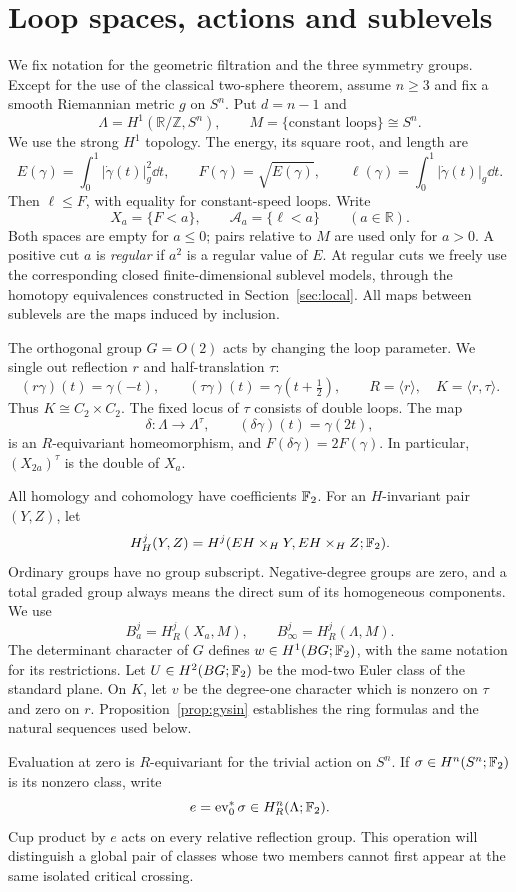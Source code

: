\section{Loop spaces, actions and sublevels}\label{sec:setup}

We fix notation for the geometric filtration and the three symmetry groups.
Except for the use of the classical two-sphere theorem, assume $n\ge3$ and
fix a smooth Riemannian metric $g$ on $S^n$. Put $d=n-1$ and
\[
 \Lambda=H^1(\mathbb R/\mathbb Z,S^n),\qquad
 M=\{\text{constant loops}\}\cong S^n.
\]
We use the strong $H^1$ topology. The energy, its square root, and length are
\[
 E(\gamma)=\int_0^1|\dot\gamma(t)|_g^2\dd t,
 \qquad F(\gamma)=\sqrt{E(\gamma)},
 \qquad \ell(\gamma)=\int_0^1|\dot\gamma(t)|_g\dd t.
\]
Then $\ell\le F$, with equality for constant-speed loops. Write
\[
 X_a=\{F<a\},\qquad \mathcal A_a=\{\ell<a\}\qquad(a\in\mathbb R).
\]
Both spaces are empty for $a\le0$; pairs relative to $M$ are used only
for $a>0$.
A positive cut $a$ is \emph{regular} if $a^2$ is a regular value of $E$.
At regular cuts we freely use the corresponding closed finite-dimensional
sublevel models, through the homotopy equivalences constructed in
Section~\ref{sec:local}. All maps between sublevels are the maps induced by
inclusion.

The orthogonal group $G=O(2)$ acts by changing the loop parameter. We single
out reflection $r$ and half-translation $\tau$:
\[
 (r\gamma)(t)=\gamma(-t),\qquad
 (\tau\gamma)(t)=\gamma(t+\tfrac12),\qquad
 R=\langle r\rangle,\quad K=\langle r,\tau\rangle.
\]
Thus $K\cong C_2\times C_2$. The fixed locus of $\tau$ consists of double
loops. The map
\[
 \delta:\Lambda\longrightarrow\Lambda^\tau,
 \qquad (\delta\gamma)(t)=\gamma(2t),
\]
is an $R$-equivariant homeomorphism, and $F(\delta\gamma)=2F(\gamma)$.
In particular, $(X_{2a})^\tau$ is the double of $X_a$.

All homology and cohomology have coefficients $\mathbb F_2$. For an $H$-invariant
pair $(Y,Z)$, let
\[
 H_H^j(Y,Z)=H^j(EH\times_HY,EH\times_HZ;\mathbb F_2).
\]
Ordinary groups have no group subscript. Negative-degree groups are zero,
and a total graded group always means the direct sum of its homogeneous
components. We use
\[
 B_a^j=H_R^j(X_a,M),\qquad
 B_\infty^j=H_R^j(\Lambda,M).
\]
The determinant character of $G$ defines $w\in H^1(BG;\mathbb F_2)$, with the same
notation for its restrictions. Let $U\in H^2(BG;\mathbb F_2)$ be the mod-two Euler
class of the standard plane. On $K$, let $v$ be the degree-one character
which is nonzero on $\tau$ and zero on $r$. Proposition~\ref{prop:gysin}
establishes the ring formulas and the natural sequences used below.

Evaluation at zero is $R$-equivariant for the trivial action on $S^n$.
If $\sigma\in H^n(S^n;\mathbb F_2)$ is its nonzero class, write
\[
 e=\operatorname{ev}_0^*\sigma\in H_R^n(\Lambda;\mathbb F_2).
\]
Cup product by $e$ acts on every relative reflection group. This operation
will distinguish a global pair of classes whose two members cannot first
appear at the same isolated critical crossing.
